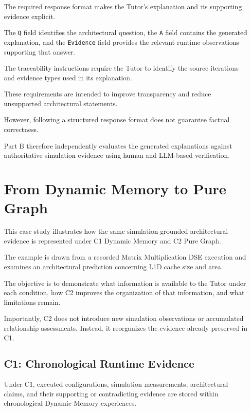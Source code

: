 The required response format makes
the Tutor's explanation and its
supporting evidence explicit.

The \texttt{Q} field identifies
the architectural question,
the \texttt{A} field contains
the generated explanation,
and the \texttt{Evidence} field
provides the relevant runtime
observations supporting that answer.

The traceability instructions
require the Tutor to identify
the source iterations and
evidence types used in its
explanation.

These requirements are intended
to improve transparency and
reduce unsupported architectural
statements.

However, following a structured
response format does not guarantee
factual correctness.

Part B therefore independently
evaluates the generated explanations
against authoritative simulation
evidence using human and
LLM-based verification.



\section{From Dynamic Memory to Pure Graph}
\label{app:p5_c1_c2_example}

This case study illustrates how the same
simulation-grounded architectural evidence
is represented under C1 Dynamic Memory
and C2 Pure Graph.

The example is drawn from a recorded
Matrix Multiplication DSE execution
and examines an architectural prediction
concerning L1D cache size and area.

The objective is to demonstrate what
information is available to the Tutor
under each condition, how C2 improves
the organization of that information,
and what limitations remain.

Importantly, C2 does not introduce
new simulation observations or
accumulated relationship assessments.
Instead, it reorganizes the evidence
already preserved in C1.

\subsection{C1: Chronological Runtime Evidence}

Under C1, executed configurations,
simulation measurements, architectural
claims, and their supporting or
contradicting evidence are stored
within chronological Dynamic Memory
experiences.

